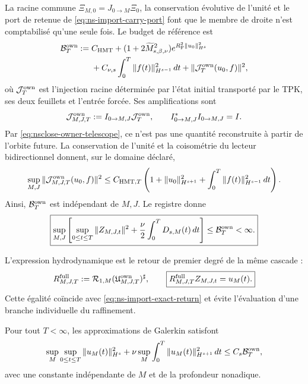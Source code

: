 La racine commune \(\Xi_{M,0}=J_{0\to M}\Xi_0\), la conservation évolutive de l'unité et le port de retenue de \eqref{eq:ns-import-carry-port} font que le membre de droite n'est comptabilisé qu'une seule fois. Le budget de référence est
\begin{equation}
 \begin{aligned}
 \mathcal B_T^{\rm own}:={}&
 C_{\rm HMT}
 +(1+2\widetilde M_{s,\beta,\nu}^2)
  e^{R_{\rm F}^2\|u_0\|_{H^s}^2}\\
 &+C_{\nu,s}\int_0^T\|f(t)\|_{H^{s-1}}^2\,dt
 +\|\mathcal J_T^{\rm own}(u_0,f)\|^2 ,
 \end{aligned}
 \label{eq:nsclose-owner-data-budget}
\end{equation}
où \(\mathcal J_T^{\rm own}\) est l'injection racine déterminée par l'état initial transporté par le TPK, ses deux feuillets et l'entrée forcée. Ses amplifications sont
\[
 \mathcal J_{M,J,T}^{\rm own}
 :=I_{0\to M,J}\mathcal J_T^{\rm own},
 \qquad I_{0\to M,J}^*I_{0\to M,J}=I.
\]
Par \eqref{eq:nsclose-owner-telescope}, ce n'est pas une quantité reconstruite à partir de l'orbite future. La conservation de l'unité et la coisométrie du lecteur bidirectionnel donnent, sur le domaine déclaré,
\begin{equation}
 \sup_{M,J}\|\mathcal J_{M,J,T}^{\rm own}(u_0,f)\|^2
 \le C_{{\rm HMT},T}
 \left(1+\|u_0\|_{H^{s+1}}^2
 +\int_0^T\|f(t)\|_{H^{s-1}}^2\,dt\right).
 \label{eq:nsclose-owner-root-uniformity}
\end{equation}
Ainsi, \(\mathcal B_T^{\rm own}\) est indépendant de \(M,J\). Le registre donne
\begin{equation}
 \boxed{
 \sup_{M,J}\left[
  \sup_{0\le t\le T}\|Z_{M,J,t}\|^2
  +\frac\nu2\int_0^TD_{s,M}(t)\,dt
 \right]\le\mathcal B_T^{\rm own}<\infty.}
 \label{eq:nsclose-proprietary-uniform-budget}
\end{equation}

L'expression hydrodynamique est le retour de premier degré de la même cascade :
\begin{equation}
 R_{M,J,T}^{\rm full}
 :=\mathcal R_{1,M}
   (\mathfrak U_{M,J,T}^{\rm own})^{\sharp},
 \qquad
 \boxed{
 R_{M,J,T}^{\rm full}Z_{M,J,t}=u_M(t).}
 \label{eq:nsclose-proprietary-exact-return}
\end{equation}
\label{eq:nsclose-exact-full-return}
Cette égalité coïncide avec \eqref{eq:ns-import-exact-return} et évite l'évaluation d'une branche individuelle du raffinement.

\begin{theorem}
\label{thm:nsclose-proprietary-full}
Pour tout \(T<\infty\), les approximations de Galerkin satisfont
\begin{equation}
 \sup_M\sup_{0\le t\le T}\|u_M(t)\|_{H^s}^2
 +\nu\sup_M\int_0^T\|u_M(t)\|_{H^{s+1}}^2\,dt
 \le C_s\mathcal B_T^{\rm own},
 \label{eq:nsclose-uniform-sobolev-precompactness}
\end{equation}
\label{eq:nsclose-uniform-sobolev}
avec une constante indépendante de \(M\) et de la profondeur nonadique.
\end{theorem}

